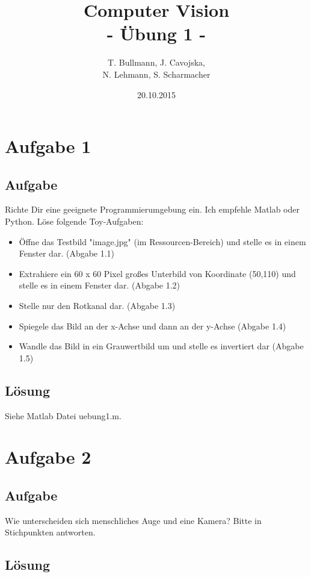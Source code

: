 \documentclass[12pt]{article}
\title{Computer Vision\\- \"Ubung 1 -}
\author{T. Bullmann, J. Cavojska,\\N. Lehmann, S. Scharmacher}
\date{20.10.2015}
\begin{document}
\maketitle
\tableofcontents
\newpage

\section{Aufgabe 1}

\subsection{Aufgabe}

Richte Dir eine geeignete Programmierumgebung ein. Ich empfehle Matlab oder Python. L\"ose folgende Toy-Aufgaben:
\begin{itemize}
\item \"Offne das Testbild "image.jpg" (im Ressourcen-Bereich) und stelle es in einem Fenster dar. (Abgabe 1.1) 
\item Extrahiere ein 60 x 60 Pixel großes Unterbild von Koordinate (50,110) und stelle es in einem Fenster dar. (Abgabe 1.2)
\item Stelle nur den Rotkanal dar. (Abgabe 1.3)
\item Spiegele das Bild an der x-Achse und dann an der y-Achse (Abgabe 1.4)
\item Wandle das Bild in ein Grauwertbild um und stelle es invertiert dar (Abgabe 1.5)
\end{itemize}

\subsection{L\"osung}

Siehe Matlab Datei \glqq uebung1.m\grqq.
\newpage

\section{Aufgabe 2}

\subsection{Aufgabe}

Wie unterscheiden sich menschliches Auge und eine Kamera? Bitte in Stichpunkten antworten.

\subsection{L\"osung}
\end{document}
